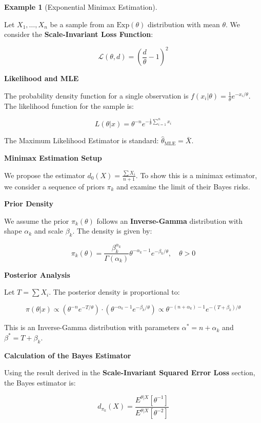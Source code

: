 \documentclass[
  letterpaper,
  DIV=11,
  numbers=noendperiod]{scrreprt}
\renewcommand{\[}{\begin{equation}}
\renewcommand{\]}{\end{equation}}
\theoremstyle{definition}
\theoremstyle{plain}
\theoremstyle{plain}
\theoremstyle{plain}
\theoremstyle{definition}
\newtheorem{example}{Example}[chapter]
\theoremstyle{plain}
\theoremstyle{remark}
\begin{document}
\begin{example}[Exponential Minimax
Estimation]\protect\hypertarget{exm-exponential-minimax}{}\label{exm-exponential-minimax}

Let \(X_1, \dots, X_n\) be a sample from an \(\text{Exp}(\theta)\)
distribution with mean \(\theta\). We consider the
\textbf{Scale-Invariant Loss Function}:

\[
\mathcal{L}(\theta, d) = \left( \frac{d}{\theta} - 1 \right)^2
\]

\textbf{Likelihood and MLE}

The probability density function for a single observation is
\(f(x_i|\theta) = \frac{1}{\theta} e^{-x_i/\theta}\). The likelihood
function for the sample is:

\[
L(\theta|x) = \theta^{-n} e^{-\frac{1}{\theta}\sum_{i=1}^n x_i}
\]

The Maximum Likelihood Estimator is standard:
\(\hat{\theta}_{\text{MLE}} = \bar{X}\).

\textbf{Minimax Estimation Setup}

We propose the estimator \(d_0(X) = \frac{\sum X_i}{n+1}\). To show this
is a minimax estimator, we consider a sequence of priors \(\pi_k\) and
examine the limit of their Bayes risks.

\textbf{Prior Density}

We assume the prior \(\pi_k(\theta)\) follows an \textbf{Inverse-Gamma}
distribution with shape \(\alpha_k\) and scale \(\beta_k\). The density
is given by:

\[
\pi_k(\theta) = \frac{\beta_k^{\alpha_k}}{\Gamma(\alpha_k)} \theta^{-\alpha_k - 1} e^{-\beta_k / \theta}, \quad \theta > 0
\]

\textbf{Posterior Analysis}

Let \(T = \sum X_i\). The posterior density is proportional to:

\[
\pi(\theta | x) \propto \left( \theta^{-n} e^{-T/\theta} \right) \cdot \left( \theta^{-\alpha_k - 1} e^{-\beta_k / \theta} \right) \propto \theta^{-(n + \alpha_k) - 1} e^{-(T + \beta_k)/\theta}
\]

This is an Inverse-Gamma distribution with parameters
\(\alpha^* = n + \alpha_k\) and \(\beta^* = T + \beta_k\).

\textbf{Calculation of the Bayes Estimator}

Using the result derived in the \textbf{Scale-Invariant Squared Error
Loss} section, the Bayes estimator is:

\[
d_{\pi_k}(X) = \frac{E^{\theta|X}[\theta^{-1}]}{E^{\theta|X}[\theta^{-2}]}
\]


\end{example}
\end{document}

